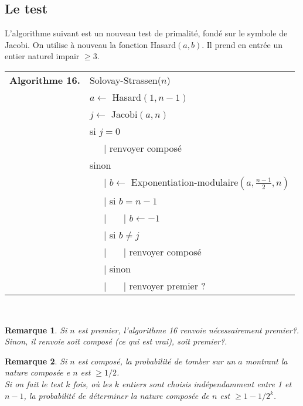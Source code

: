 \documentclass[12pt]{report}
\newtheorem*{rem}{Remarque}
\begin{document}
\subsection{Le test}

L'algorithme suivant est un nouveau test de primalité, fondé sur le symbole de Jacobi. On utilise à nouveau la fonction Hasard$(a,b)$. Il prend en entrée un entier naturel impair $\geq 3$.\\



\begin{tabular}{ll}
\textbf{Algorithme 16.} & Solovay-Strassen($n$)\\
           & $a \leftarrow$ Hasard$(1,n-1)$  \\
           & $j \leftarrow$ Jacobi$(a,n)$ \\
           &  si $j=0$  \\
           & \ \ \ {\rm |} renvoyer composé \\
           &  sinon  \\
           & \ \ \ {\rm |}  $b \leftarrow $ Exponentiation-modulaire$(a,\tfrac{n-1}{2},n)$ \\
           & \ \ \ {\rm |} si $b=n-1$ \\
           & \ \ \ {\rm |} \ \ \ {\rm |} $b \leftarrow -1$ \\
           & \ \ \ {\rm |} si $b\neq j$\\
           &   \ \ \ {\rm |} \ \ \ {\rm |} renvoyer composé \\           
           & \ \ \ {\rm |} sinon \\
           & \ \ \ {\rm |} \ \ \ {\rm |} renvoyer premier ?
\end{tabular}\\

\begin{rem}
Si $n$ est premier, l'algorithme 16 renvoie nécessairement premier?. Sinon, il renvoie soit composé (ce qui est vrai), soit premier?. 
\end{rem}

\begin{rem}
Si $n$ est composé, la probabilité de tomber sur un $a$ montrant la nature composée e $n$ est $\geq 1/2$. \\
Si on fait le test $k$ fois, où les $k$ entiers sont choisis indépendamment entre 1 et $n-1$, la probabilité de déterminer la nature composée de $n$ est $\geq 1-1/2^k$.
\end{rem}
\end{document}
